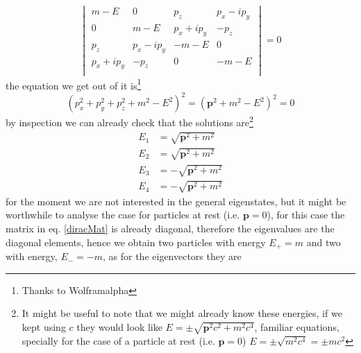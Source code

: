 \begin{equation*}
    \begin{vmatrix}
     m - E & 0 & p_z & p_x -i  p_y\\
     0 & m-E & p_x + ip_y & -p_z \\
     p_z & p_x -i  p_y & -m-E & 0 \\
     p_x + ip_y & -p_z & 0& -m-E\\
    \end{vmatrix} = 0
\end{equation*}
the equation we get out of it is\footnote{Thanks to Wolframalpha}
\begin{equation}
    (p_x^2 + p_y^2 + p_z^2 + m^2 - E^2)^2 = (\bm{p}^2 + m^2 - E^2)^2 = 0
\end{equation}
by inspection we can already check that the solutions are\footnote{It might be useful to note that we might already know these energies, if we kept using $c$ they would look like $E = \pm \sqrt{\bm{p}^2c^2 + m^2c^4}$, familiar equations, specially for the case of a particle at rest (i.e. $\bm{p} = 0$) $E = \pm \sqrt{m^2c^4} = \pm mc^2$}
\begin{equation*}
\begin{aligned}
  E_1 &= \sqrt{\bm{p}^2 + m^2}\\
  E_2 &= \sqrt{\bm{p}^2 + m^2}\\
  E_3 &= -\sqrt{\bm{p}^2 + m^2}\\
  E_4 &= -\sqrt{\bm{p}^2 + m^2}
  \end{aligned}
\end{equation*}
for the moment we are not interested in the general eigenstates, but it might be worthwhile to analyse the case for particles at rest (i.e. $\bm{p}=0$), for this case the matrix in eq. \ref{diracMat} is already diagonal, therefore the eigenvalues are the diagonal elements, hence we obtain two particles with energy $E_+ = m$ and two with energy, $E_- = -m$, as for the eigenvectors they are

